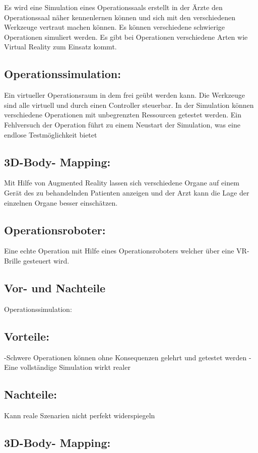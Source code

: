 
Es wird eine Simulation eines Operationssaals erstellt in der Ärzte den Operationssaal näher kennenlernen können und sich mit den verschiedenen Werkzeuge vertraut machen können. Es können verschiedene schwierige Operationen simuliert werden. Es gibt bei Operationen verschiedene Arten wie Virtual Reality zum Einsatz kommt.\\
\subsection{Operationssimulation:}
Ein virtueller Operationsraum in dem frei geübt werden kann. Die Werkzeuge sind alle virtuell und durch einen Controller steuerbar. In der Simulation können verschiedene Operationen mit unbegrenzten Ressourcen getestet werden. Ein Fehlversuch der Operation führt zu einem Neustart der Simulation, was eine endlose Testmöglichkeit bietet\\
\subsection{3D-Body- Mapping:}
Mit Hilfe von Augmented Reality lassen sich verschiedene Organe auf einem Gerät des zu behandelnden Patienten anzeigen und der Arzt kann die Lage der einzelnen Organe besser einschätzen. \cite{mehlitz1998virtual} \\
\subsection{Operationsroboter:}
Eine echte Operation mit Hilfe eines Operationsroboters welcher über eine VR-Brille gesteuert wird.

\subsection{Vor- und Nachteile}
Operationssimulation:\\
\subsection{Vorteile:}
-Schwere Operationen
können ohne Konsequenzen gelehrt und getestet werden
-Eine vollständige Simulation wirkt realer
\subsection{Nachteile:}
Kann reale Szenarien nicht perfekt widerspiegeln
\subsection{3D-Body- Mapping:}
